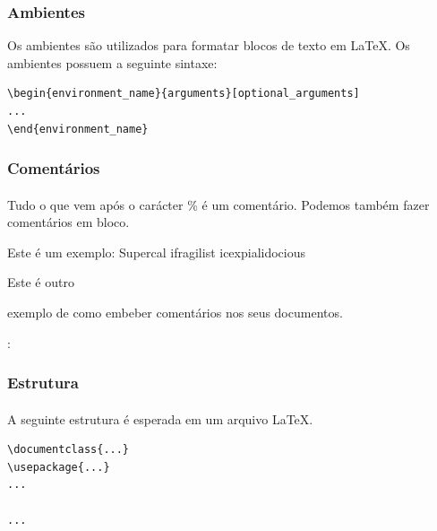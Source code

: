 \begin{frame}[fragile]
\frametitle{Ambientes}
Os ambientes são utilizados para formatar blocos de texto em \LaTeX{}.
Os ambientes possuem a seguinte sintaxe:

\begin{verbatim}
\begin{environment_name}{arguments}[optional_arguments]
...
\end{environment_name}
\end{verbatim}

\begin{LTXexample}
\begin{center}
\lipsum[1][1-4]
\end{center}
\end{LTXexample}

\end{frame}


\begin{frame}[fragile]
\frametitle{Comentários}
\framesubtitle{}
Tudo o que vem após o carácter \% é um comentário. Podemos também fazer comentários em bloco.

\begin{LTXexample}
Este é um %
exemplo: Supercal%
ifragilist%
icexpialidocious

Este é outro

exemplo de como embeber
comentários nos seus documentos.
\end{LTXexample}:
\end{frame}

\begin{frame}[fragile]
\frametitle{Estrutura}
\framesubtitle{}
  A seguinte estrutura é esperada em um arquivo \LaTeX{}.

\begin{verbatim}
\documentclass{...}
\usepackage{...}
...

...

\end{verbatim}
\end{frame}

